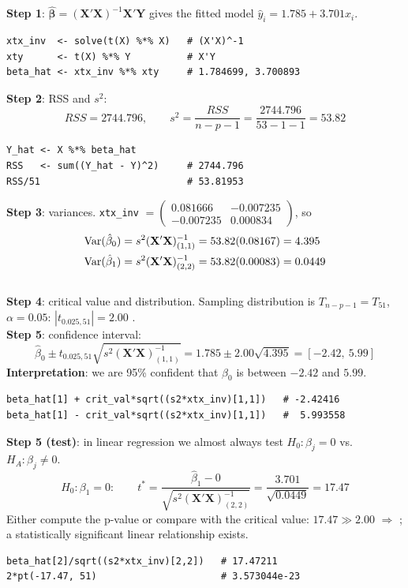 \begin{example}
    \textbf{Step 1}: $\hat{\boldsymbol\beta}=(\mathbf{X}'\mathbf{X})^{-1}\mathbf{X}'\mathbf{Y}$
    gives the fitted model $\hat y_i=1.785+3.701x_i$.
\begin{verbatim}
xtx_inv  <- solve(t(X) %*% X)   # (X'X)^-1
xty      <- t(X) %*% Y          # X'Y
beta_hat <- xtx_inv %*% xty     # 1.784699, 3.700893
\end{verbatim}
    \textbf{Step 2}: RSS and $s^2$:
    \[RSS=2744.796,\qquad s^2=\frac{RSS}{n-p-1}=\frac{2744.796}{53-1-1}=53.82\]
\begin{verbatim}
Y_hat <- X %*% beta_hat
RSS   <- sum((Y_hat - Y)^2)     # 2744.796
RSS/51                          # 53.81953
\end{verbatim}
    \textbf{Step 3}: variances. \texttt{xtx\_inv} $=\begin{pmatrix}0.081666 & -0.007235\\ -0.007235 & 0.000834\end{pmatrix}$, so
    \begin{align*}
        \operatorname{Var}(\hat\beta_0)&=s^2(\mathbf{X}'\mathbf{X})^{-1}_{(1,1)}=53.82(0.08167)=4.395\\
        \operatorname{Var}(\hat\beta_1)&=s^2(\mathbf{X}'\mathbf{X})^{-1}_{(2,2)}=53.82(0.00083)=0.0449
    \end{align*}
    \\ \textbf{Step 4}: critical value and distribution. Sampling distribution is
    $T_{n-p-1}=T_{51}$, $\alpha=0.05$:
    $|t_{0.025,51}|=2.00$ .
    \\ \textbf{Step 5}: confidence interval:
    \[\hat\beta_0\pm t_{0.025,51}\sqrt{s^2(\mathbf{X}'\mathbf{X})^{-1}_{(1,1)}}=1.785\pm2.00\sqrt{4.395}=[-2.42,\ 5.99]\]
    \textbf{Interpretation}: we are 95\% confident that $\beta_0$ is between $-2.42$ and
    $5.99$. 
\begin{verbatim}
beta_hat[1] + crit_val*sqrt((s2*xtx_inv)[1,1])   # -2.42416
beta_hat[1] - crit_val*sqrt((s2*xtx_inv)[1,1])   #  5.993558
\end{verbatim}
    \textbf{Step 5 (test)}: in linear regression we almost always test $H_0:\beta_j=0$ vs.\ $H_A:\beta_j\neq0$.
    \[H_0:\beta_1=0:\qquad t^*=\frac{\hat\beta_1-0}{\sqrt{s^2(\mathbf{X}'\mathbf{X})^{-1}_{(2,2)}}}=\frac{3.701}{\sqrt{0.0449}}=17.47\]
    Either compute the p-value or compare with the critical value: $17.47\gg2.00$
    $\Rightarrow$ ; a statistically significant linear relationship exists.
\begin{verbatim}
beta_hat[2]/sqrt((s2*xtx_inv)[2,2])   # 17.47211
2*pt(-17.47, 51)                      # 3.573044e-23
\end{verbatim}
\end{example}

